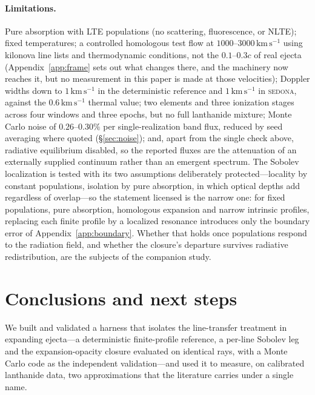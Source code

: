 \documentclass[fleqn,usenatbib]{mnras}
\newcommand{\kms}{\,\mathrm{km\,s^{-1}}}
\begin{document}
\paragraph{Limitations.}
Pure absorption with LTE populations (no scattering, fluorescence, or
NLTE); fixed temperatures; a controlled homologous test flow at
$1000$--$3000\kms$ using kilonova line lists and thermodynamic conditions,
not the $0.1$--$0.3c$ of real ejecta (Appendix~\ref{app:frame} sets out what
changes there, and the machinery now reaches it, but no measurement in this
paper is made at those velocities); Doppler widths down to $1\kms$ in the
deterministic reference and $1\kms$ in \textsc{sedona}, against the
$0.6\kms$ thermal value; two elements and three ionization stages across four
windows and three epochs, but no full lanthanide mixture; Monte Carlo noise
of $0.26$--$0.30\%$ per single-realization band flux, reduced by seed
averaging where quoted (\S\ref{sec:noise}); and, apart from the single check
above, radiative equilibrium disabled, so the reported fluxes are the
attenuation of an externally supplied continuum rather than an emergent
spectrum. The Sobolev localization is tested with its two assumptions
deliberately protected---locality by constant populations, isolation by pure
absorption, in which optical depths add regardless of overlap---so the
statement licensed is the narrow one: for fixed populations, pure absorption,
homologous expansion and narrow intrinsic profiles, replacing each finite
profile by a localized resonance introduces only the boundary error of
Appendix~\ref{app:boundary}. Whether that holds once populations respond to
the radiation field, and whether the closure's departure survives radiative
redistribution, are the subjects of the companion study.

\section{Conclusions and next steps}

We built and validated a harness that isolates the line-transfer treatment in
expanding ejecta---a deterministic finite-profile reference, a per-line
Sobolev leg and the expansion-opacity closure evaluated on identical rays,
with a Monte Carlo code as the independent validation---and used it to
measure, on calibrated lanthanide data, two approximations that the literature
carries under a single name.
\end{document}
